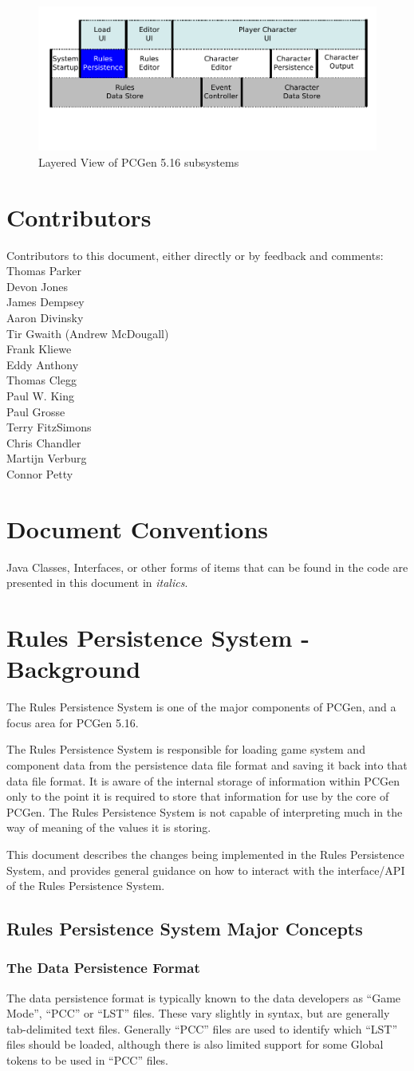 \documentclass[12pt,letterpaper]{article}
\newcommand{\contributors}{
Thomas Parker\\
Devon Jones\\
James Dempsey\\
Aaron Divinsky\\
Tir Gwaith (Andrew McDougall)\\
Frank Kliewe\\
Eddy Anthony\\
Thomas Clegg\\
Paul W. King\\
Paul Grosse\\
Terry FitzSimons\\
Chris Chandler\\
Martijn Verburg\\
Connor Petty\\
}
\newcommand{\pcgenversEOS}{5.16}
\newcommand{\systemEOS}{Rules Persistence System}
\newcommand{\system}{\systemEOS{} }
\newcommand{\pcgenvers}{\pcgenversEOS{} }
\newcommand{\textem}[1]{\emph{#1}}
\newcommand{\nsection}[1]{\newpage \section{#1}}
\newcommand{\lsection}[1]{\label{#1}\section{#1}}
\newcommand{\lnsection}[1]{\label{#1}\nsection{#1}}
\newcommand{\lsubsection}[1]{\label{#1}\subsection{#1}}
\newcommand{\lsubsubsection}[1]{\subsubsection{#1}\label{#1}}
\newcommand{\openfig}{\begin{figure}[hbt]}
\newcommand{\closefig}[1]{\vspace*{-0.15in}\caption{#1}\end{figure}}
\begin{document}
\openfig\centerline{\includegraphics[width=6.5in]{rsf.pdf}}\closefig{\label{Fig: Layered Subsystems}Layered View of PCGen \pcgenvers subsystems}

\lnsection{Contributors}

Contributors to this document, either directly or by feedback and comments:\\
\contributors

\lsection{Document Conventions}

Java Classes, Interfaces, or other forms of items that can be found in the code are
presented in this document in \textem{italics}.  

\lnsection{\system - Background}

The \system is one of the major components of PCGen, and a focus area for PCGen \pcgenversEOS.

The \system is responsible for loading game system and component data from the
persistence data file format and saving it back into that data file format.  It is aware of the 
internal storage of information within PCGen only to the point it is required to store that
information for use by the core of PCGen.  The \system is not capable of interpreting much
in the way of meaning of the values it is storing.

This document describes the changes being implemented in the \systemEOS, and 
provides general guidance on how to interact with the interface/API of the \systemEOS.

\lsubsection{\system Major Concepts}

\lsubsubsection{The Data Persistence Format}

The data persistence format is typically known to the data developers as ``Game Mode'',
``PCC'' or ``LST'' files.  These vary slightly in syntax, but are generally tab-delimited
text files.  Generally ``PCC'' files are used to identify which ``LST'' files should be 
loaded, although there is also limited support for some Global tokens to be used in 
``PCC'' files.
\end{document}
